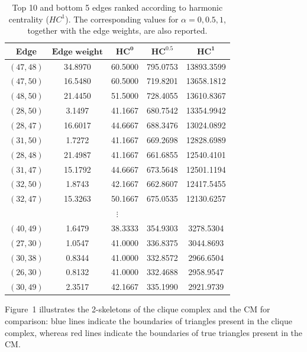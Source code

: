 \documentclass[12pt]{article}
\theoremstyle{normalhead_nobrackets}
\theoremstyle{exampstyle}
\begin{document}
\begin{table}[h!]
\centering
\setlength{\tabcolsep}{6pt}
\renewcommand{\arraystretch}{1.15}

\begin{tabular}{|c|c|c|c|c|}
\hline
\textbf{Edge} & $\textbf{Edge weight}$ & $\mathbf{HC^{0}}$ & $\mathbf{HC^{0.5}}$ & $\mathbf{HC^{1}}$ \\
\hline

$(47,48)$ & 34.8970 & 60.5000 & 795.0753 & 13893.3599 \\
\hline
$(47,50)$ & 16.5480 & 60.5000 & 719.8201 & 13658.1812 \\
\hline
$(48,50)$ & 21.4450 & 51.5000 & 728.4055 & 13610.8367 \\
\hline
$(28,50)$ & 3.1497  & 41.1667 & 680.7542 & 13354.9942 \\
\hline
$(28,47)$ & 16.6017 & 44.6667 & 688.3476 & 13024.0892 \\
\hline
$(31,50)$ & 1.7272  & 41.1667 & 669.2698 & 12828.6989 \\
\hline
$(28,48)$ & 21.4987 & 41.1667 & 661.6855 & 12540.4101 \\
\hline
$(31,47)$ & 15.1792 & 44.6667 & 673.5648 & 12501.1194 \\
\hline
$(32,50)$ & 1.8743  & 42.1667 & 662.8607 & 12417.5455 \\
\hline
$(32,47)$ & 15.3263 & 50.1667 & 675.0535 & 12130.6257 \\
\hline

\multicolumn{5}{|c|}{$\vdots$} \\
\hline

$(40,49)$ & 1.6479 & 38.3333 & 354.9303 & 3278.5304 \\
\hline
$(27,30)$ & 1.0547 & 41.0000 & 336.8375 & 3044.8693 \\
\hline
$(30,38)$ & 0.8344 & 41.0000 & 332.8572 & 2966.6504 \\
\hline
$(26,30)$ & 0.8132 & 41.0000 & 332.4688 & 2958.9547 \\
\hline
$(30,49)$ & 2.3517 & 42.1667 & 335.1990 & 2921.9739 \\
\hline

\end{tabular}

\caption{Top 10 and bottom 5 edges ranked according to harmonic centrality ($HC^{1}$). The corresponding values for $\alpha = 0, 0.5, 1$, together with the edge weights, are also reported.}
\end{table}


Figure~1 illustrates the 2-skeletons of the clique complex and the CM for comparison: blue lines indicate the boundaries of triangles present in the clique complex, whereas red lines indicate the boundaries of true triangles present in the CM.
\end{document}
